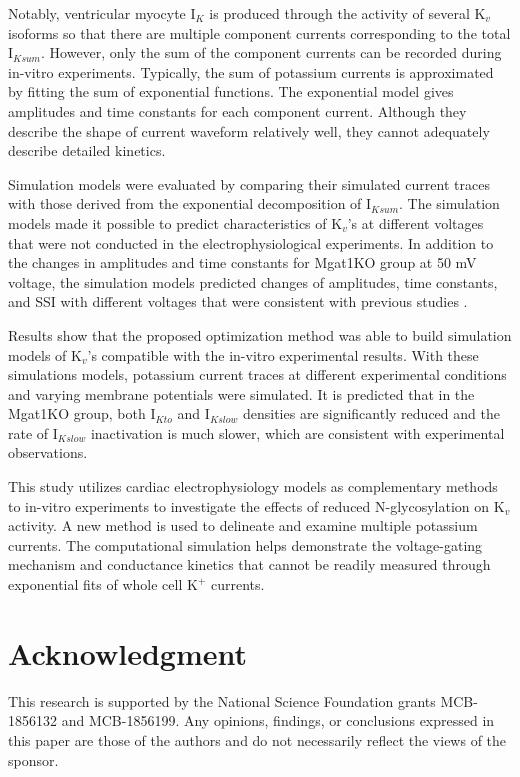 \documentclass[journal]{IEEEtran}
\begin{document}
Notably, ventricular myocyte $\text{I}_{K}$ is produced through the activity of several $\text{K}_{v}$ isoforms so that there are multiple component currents corresponding to the total $\text{I}_{Ksum}$. However, only the sum of the component currents can be recorded during in-vitro experiments. Typically, the sum of potassium currents is approximated by fitting the sum of exponential functions. The exponential model gives amplitudes and time constants for each component current. Although they describe the shape of current waveform relatively well, they cannot adequately describe detailed kinetics.

Simulation models were evaluated by comparing their simulated current traces with those derived from the exponential decomposition of $\text{I}_{Ksum}$. The simulation models made it possible to predict characteristics of $\text{K}_{v}$'s at different voltages that were not conducted in the electrophysiological experiments. In addition to the changes in amplitudes and time constants for Mgat1KO group at 50 mV voltage, the simulation models predicted changes of amplitudes, time constants, and SSI with different voltages that were consistent with previous studies \cite{ednie2019reduced}.

Results show that the proposed optimization method was able to build simulation models of $\text{K}_{v}$'s compatible with the in-vitro experimental results. With these simulations models, potassium current traces at different experimental conditions and varying membrane potentials were simulated. It is predicted that in the Mgat1KO group, both $\text{I}_{Kto}$ and $\text{I}_{Kslow}$ densities are significantly reduced and the rate of $\text{I}_{Kslow}$ inactivation is much slower, which are consistent with experimental observations.

This study utilizes cardiac electrophysiology models as complementary methods to in-vitro experiments to investigate the effects of reduced N-glycosylation on $\text{K}_{v}$ activity. A new method is used to delineate and examine multiple potassium currents. The computational simulation helps demonstrate the voltage-gating mechanism and conductance kinetics that cannot be readily measured through exponential fits of whole cell $\text{K}^{+}$ currents. 

\section*{Acknowledgment}
This research is supported by the National Science Foundation grants MCB-1856132 and MCB-1856199. Any opinions, findings, or conclusions expressed in this paper are those of the authors and do not necessarily reflect the views of the sponsor.
\end{document}
